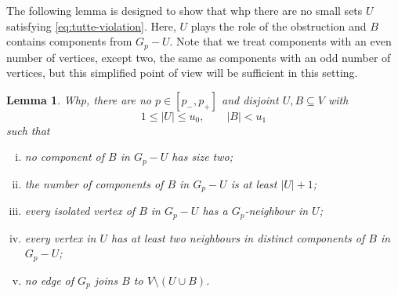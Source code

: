 \documentclass[notitlepage]{scrartcl}
\newtheorem{lemma}[thm]{Lemma}
\newcommand{\cP}{\mathcal{P}}
\begin{document}
The following lemma is designed to show that whp there are no small sets $U$ satisfying \eqref{eq:tutte-violation}. Here, $U$ plays the role of the obstruction and $B$ contains components from $G_p-U$. Note that we treat components with an even number of vertices, except two, the same as components with an odd number of vertices, but this simplified point of view will be sufficient in this setting.


\begin{lemma}\label{lem:small-components-count}
Whp, there are no $p\in[p_-,p_+]$ and disjoint $U,B\subseteq V$ with
\[
1 \leq |U| \leq u_0, \qquad |B|<u_1
\]
such that
\begin{enumerate}[(i)]
\item no component of $B$ in $G_p-U$ has size two;
 \item the number of components of $B$ in $G_p-U$ is at least $|U|+1$;
 \item every isolated vertex of $B$ in $G_p-U$ has a $G_p$-neighbour in $U$;
 \item every vertex in $U$ has at least two neighbours in distinct components of $B$ in $G_p-U$;
 \item no edge of $G_p$ joins $B$ to $V\setminus(U\cup B)$.
\end{enumerate}
\end{lemma}
\end{document}
